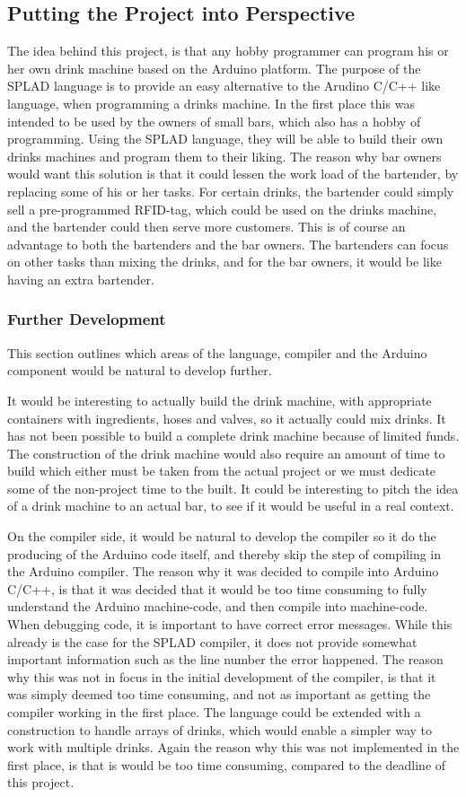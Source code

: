 \subsection{Putting the Project into Perspective}
The idea behind this project, is that any hobby programmer can program his or her own drink machine based on the Arduino platform. The purpose of the SPLAD language is to provide an easy alternative to the Arudino C/C++ like language, when programming a drinks machine. In the first place this was intended to be used by the owners of small bars, which also has a hobby of programming. Using the SPLAD language, they will be able to build their own drinks machines and program them to their liking. The reason why bar owners would want this solution is that it could lessen the work load of the bartender, by replacing some of his or her tasks. For certain drinks, the bartender could simply sell a pre-programmed RFID-tag, which could be used on the drinks machine, and the bartender could then serve more customers. This is of course an advantage to both the bartenders and the bar owners. The bartenders can focus on other tasks than mixing the drinks, and for the bar owners, it would be like having an extra bartender. 

\subsubsection{Further Development}
This section outlines which areas of the language, compiler and the Arduino component would be natural to develop further.

It would be interesting to actually build the drink machine, with appropriate containers with ingredients, hoses and valves, so it actually could mix drinks. It has not been possible to build a complete drink machine because of limited funds. The construction of the drink machine would also require an amount of time to build which either must be taken from the actual project or we must dedicate some of the non-project time to the built. It could be interesting to pitch the idea of a drink machine to an actual bar, to see if it would be useful in a real context.

On the compiler side, it would be natural to develop the compiler so it do the producing of the Arduino code itself, and thereby skip the step of compiling in the Arduino compiler. The reason why it was decided to compile into Arduino C/C++, is that it was decided that it would be too time consuming to fully understand the Arduino machine-code, and then compile into machine-code. When debugging code, it is important to have correct error messages. While this already is the case for the SPLAD compiler, it does not provide somewhat important information such as the line number the error happened. The reason why this was not in focus in the initial development of the compiler, is that it was simply deemed too time consuming, and not as important as getting the compiler working in the first place. The language could be extended with a construction to handle arrays of drinks, which would enable a simpler way to work with multiple drinks. Again the reason why this was not implemented in the first place, is that is would be too time consuming, compared to the deadline of this project.